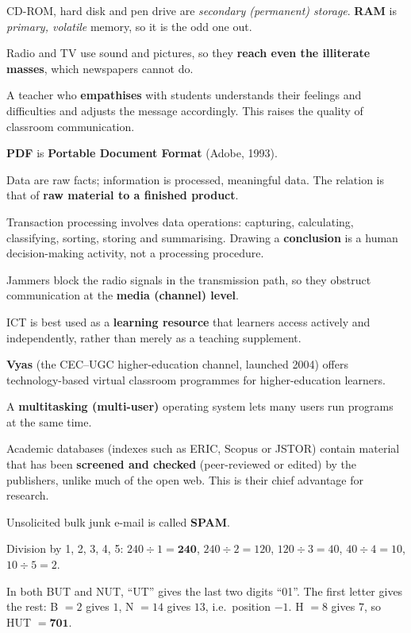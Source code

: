 CD-ROM, hard disk and pen drive are \emph{secondary (permanent) storage}. \textbf{RAM} is \emph{primary, volatile} memory, so it is the odd one out.

Radio and TV use sound and pictures, so they \textbf{reach even the illiterate masses}, which newspapers cannot do.

A teacher who \textbf{empathises} with students understands their feelings and difficulties and adjusts the message accordingly. This raises the quality of classroom communication.

\textbf{PDF} is \textbf{Portable Document Format} (Adobe, 1993).

Data are raw facts; information is processed, meaningful data. The relation is that of \textbf{raw material to a finished product}.

Transaction processing involves data operations: capturing, calculating, classifying, sorting, storing and summarising. Drawing a \textbf{conclusion} is a human decision-making activity, not a processing procedure.

Jammers block the radio signals in the transmission path, so they obstruct communication at the \textbf{media (channel) level}.

ICT is best used as a \textbf{learning resource} that learners access actively and independently, rather than merely as a teaching supplement.

\textbf{Vyas} (the CEC--UGC higher-education channel, launched 2004) offers technology-based virtual classroom programmes for higher-education learners.

A \textbf{multitasking (multi-user)} operating system lets many users run programs at the same time.

Academic databases (indexes such as ERIC, Scopus or JSTOR) contain material that has been \textbf{screened and checked} (peer-reviewed or edited) by the publishers, unlike much of the open web. This is their chief advantage for research.

Unsolicited bulk junk e-mail is called \textbf{SPAM}.

Division by 1, 2, 3, 4, 5: $240\div1=\mathbf{240}$, $240\div2=120$, $120\div3=40$, $40\div4=10$, $10\div5=2$.

In both BUT and NUT, ``UT'' gives the last two digits ``01''. The first letter gives the rest: B $=2$ gives $1$, N $=14$ gives $13$, i.e.\ position $-1$. H $=8$ gives $7$, so HUT $=\mathbf{701}$.

